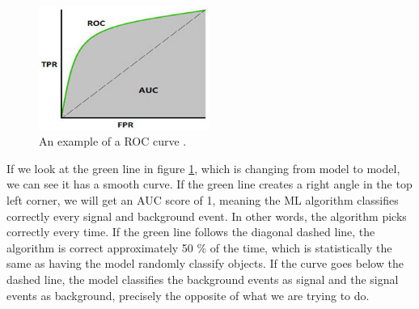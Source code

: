 \begin{figure}[H]
    \centering
    \includegraphics[width = 0.5\textwidth]{Figures/FromOnline/ROCAUC.jpg}
    \caption{An example of a ROC curve \cite{ROCAUC}.}
    \label{fig:ROCAUCex}
\end{figure}

If we look at the green line in figure \ref{fig:ROCAUCex}, which is changing from model to model, we can see it has a smooth curve. If the green line creates a right angle in the top left corner, we will get an AUC score of 1, meaning the ML algorithm classifies correctly every signal and background event. In other words, the algorithm picks correctly every time. If the green line follows the diagonal dashed line, the algorithm is correct approximately 50 \% of the time, which is statistically the same as having the model randomly classify objects. If the curve goes below the dashed line, the model classifies the background events as signal and the signal events as background, precisely the opposite of what we are trying to do. 

